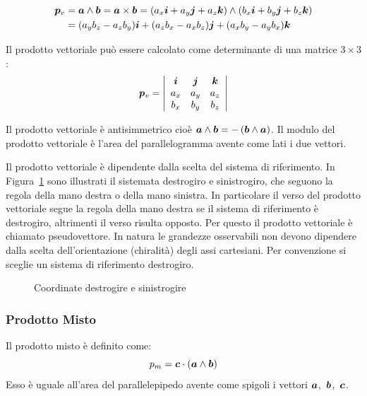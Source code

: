 \begin{align*}
  \boldsymbol{p}_v & =\boldsymbol{a} \wedge \boldsymbol{b}=\boldsymbol{a} \times \boldsymbol{b}=(a_x\boldsymbol{i}+a_y\boldsymbol{j}+a_z\boldsymbol{k})\wedge(b_x\boldsymbol{i}+b_y\boldsymbol{j}+b_z\boldsymbol{k})                                                                       \\
          & =(a_yb_z-a_zb_y)\boldsymbol{i}+(a_zb_x-a_xb_z)\boldsymbol{j}+(a_xb_y-a_yb_x)\boldsymbol{k}
\end{align*}

Il prodotto vettoriale può essere calcolato come determinante di una matrice $3\times 3$:
\[\boldsymbol{p}_v=
  \left| \begin{array}{ccc} \boldsymbol{i} & \boldsymbol{j} & \boldsymbol{k} \\
             a_x         & a_y   & a_z   \\
             b_x         & b_y   & b_z
  \end{array} \right|\]

Il prodotto vettoriale è antisimmetrico cioè $\boldsymbol{a} \wedge \boldsymbol{b}=-\left(\boldsymbol{b} \wedge \boldsymbol{a}\right)$. Il modulo del prodotto
vettoriale è l'area del parallelogramma avente come lati i due
vettori.

Il prodotto vettoriale è dipendente dalla scelta del sistema di riferimento.
In Figura~\ref{fig:sistema_destrogiro} sono illustrati il sistemata destrogiro e sinistrogiro, che seguono la regola della mano destra o della mano sinistra.
In particolare il verso del prodotto vettoriale segue la regola della mano destra se il sistema di riferimento è destrogiro, altrimenti il verso risulta opposto. Per questo il prodotto vettoriale è chiamato pseudovettore. In natura le grandezze osservabili non devono dipendere dalla scelta dell'orientazione (chiralità) degli assi cartesiani. Per convenzione si sceglie un sistema di riferimento destrogiro.
\begin{figure}[htbp]
  \centering
  \subfigure[destrogiro]{}
  \subfigure[sinistrogiro]{}
  \caption{Coordinate destrogire e sinistrogire}
  \label{fig:sistema_destrogiro}
\end{figure}

\subsubsection{Prodotto Misto}
Il prodotto misto è definito come:
\[p_m=\boldsymbol{c}\cdot\left(\boldsymbol{a} \wedge \boldsymbol{b}\right)\]
Esso è uguale all'area del parallelepipedo avente come spigoli i
vettori \mbox{$\boldsymbol{a}$, $\boldsymbol{b}$, $\boldsymbol{c}$.}

